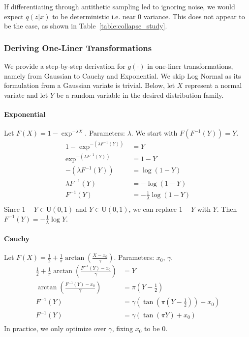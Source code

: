 If differentiating through antithetic sampling led to ignoring noise, we would expect $q(z|x)$ to be deterministic i.e. near 0 variance. This does not appear to be the case, as shown in Table~\ref{table:collapse_study}.


\subsubsection{Deriving One-Liner Transformations}

We provide a step-by-step derivation for $g(\cdot)$ in one-liner transformations, namely from Gaussian to Cauchy and Exponential. We skip Log Normal as its formulation from a Gaussian variate is trivial. Below, let $X$ represent a normal variate and let $Y$ be a random variable in the desired distribution family.

\paragraph{Exponential} Let $F(X) = 1 - \exp^{-\lambda X}$. Parameters: $\lambda$. We start with $F(F^{-1}(Y)) = Y$.
\begin{align*}
    1 - \exp^{-(\lambda F^{-1}(Y))} &= Y \\
    \exp^{-(\lambda F^{-1}(Y))} &= 1 - Y \\
    -(\lambda F^{-1}(Y)) &= \log (1 - Y) \\
   \lambda F^{-1}(Y) &= -\log (1 - Y) \\
   F^{-1}(Y)& = -\frac{1}{\lambda} \log (1 - Y) \\
\end{align*}
Since $1 - Y \in \text{U}(0, 1)$ and $Y \in \text{U}(0, 1)$, we can replace $1 - Y$ with $Y$.
Then $F^{-1}(Y) = -\frac{1}{\lambda}\log Y$.

\paragraph{Cauchy}
Let $F(X) = \frac{1}{2} + \frac{1}{\pi}\arctan(\frac{X - x_0}{\gamma})$. Parameters: $x_0$, $\gamma$.
\begin{align*}
    \frac{1}{2} +   \frac{1}{\pi}\arctan(\frac{F^{-1}(Y) - x_0}{\gamma}) &= Y \\
    \arctan(\frac{F^{-1}(Y) - x_0}{\gamma}) &= \pi(Y - \frac{1}{2}) \\
    F^{-1}(Y) &= \gamma(\tan(\pi(Y - \frac{1}{2})) + x_0) \\
    F^{-1}(Y) &= \gamma(\tan(\pi Y) + x_0) \\
\end{align*}
In practice, we only optimize over $\gamma$, fixing $x_0$ to be 0.

